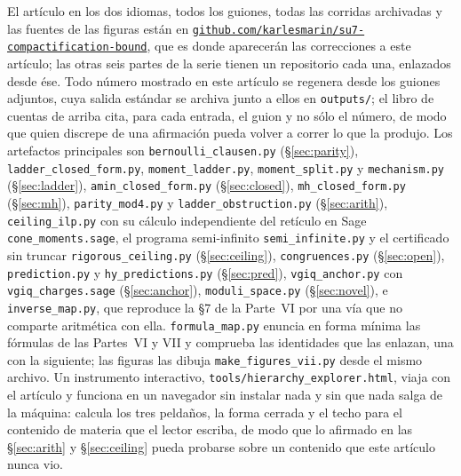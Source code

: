\documentclass[11pt,a4paper]{article}
\begin{document}
\begingroup
El artículo en los dos idiomas, todos los guiones, todas las corridas archivadas y las fuentes de
las figuras están en
\href{https://github.com/karlesmarin/su7-compactification-bound}{\texttt{github.com/karlesmarin/su7-compactification-bound}},
que es donde aparecerán las correcciones a este artículo; las otras seis partes de la serie tienen
un repositorio cada una, enlazados desde ése.
Todo número mostrado en este artículo se regenera desde los guiones adjuntos, cuya salida estándar
se archiva junto a ellos en \texttt{outputs/}; el libro de cuentas de arriba cita, para cada
entrada, el guion y no sólo el número, de modo que quien discrepe de una afirmación pueda volver a
correr lo que la produjo. Los artefactos principales son
\texttt{bernoulli\_\allowbreak clausen.py} (\S\ref{sec:parity}),
\texttt{ladder\_\allowbreak closed\_\allowbreak form.py}, \texttt{moment\_\allowbreak ladder.py},
\texttt{moment\_\allowbreak split.py} y \texttt{mechanism.py} (\S\ref{sec:ladder}),
\texttt{amin\_\allowbreak closed\_\allowbreak form.py} (\S\ref{sec:closed}),
\texttt{mh\_\allowbreak closed\_\allowbreak form.py} (\S\ref{sec:mh}),
\texttt{parity\_\allowbreak mod4.py} y \texttt{ladder\_\allowbreak obstruction.py} (\S\ref{sec:arith}),
\texttt{ceiling\_\allowbreak ilp.py} con su cálculo independiente del retículo en Sage
\texttt{cone\_\allowbreak moments.sage}, el programa semi-infinito
\texttt{semi\_\allowbreak infinite.py} y el certificado sin truncar
\texttt{rigorous\_\allowbreak ceiling.py} (\S\ref{sec:ceiling}),
\texttt{congruences.py} (\S\ref{sec:open}),
\texttt{prediction.py} y \texttt{hy\_\allowbreak predictions.py} (\S\ref{sec:pred}),
\texttt{vgiq\_\allowbreak anchor.py} con \texttt{vgiq\_\allowbreak charges.sage} (\S\ref{sec:anchor}),
\texttt{moduli\_\allowbreak space.py} (\S\ref{sec:novel}),
e \texttt{inverse\_\allowbreak map.py}, que reproduce la \S7 de la Parte~VI por una vía que no
comparte aritmética con ella.
\texttt{formula\_\allowbreak map.py} enuncia en forma mínima las fórmulas de las Partes~VI y VII y
comprueba las identidades que las enlazan, una con la siguiente; las figuras las dibuja
\texttt{make\_\allowbreak figures\_\allowbreak vii.py} desde el mismo archivo.
Un instrumento interactivo, \texttt{tools/hierarchy\_\allowbreak explorer.html}, viaja con el
artículo y funciona en un navegador sin instalar nada y sin que nada salga de la máquina: calcula
los tres peldaños, la forma cerrada y el techo para el contenido de materia que el lector escriba,
de modo que lo afirmado en las \S\ref{sec:arith} y \S\ref{sec:ceiling} pueda probarse sobre un
contenido que este artículo nunca vio.
\end{document}
